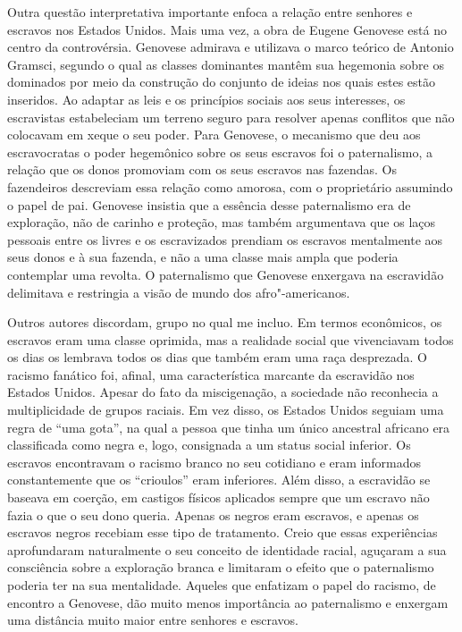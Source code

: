 Outra questão interpretativa importante enfoca a relação entre senhores
e escravos nos Estados Unidos. Mais uma vez, a obra de Eugene Genovese
está no centro da controvérsia. Genovese admirava e utilizava o marco
teórico de Antonio Gramsci, segundo o qual as classes dominantes mantêm
sua hegemonia sobre os dominados por meio da construção do conjunto de
ideias nos quais estes estão inseridos. Ao adaptar as leis e os
princípios sociais aos seus interesses, os escravistas estabeleciam um
terreno seguro para resolver apenas conflitos que não colocavam em xeque
o seu poder. Para Genovese, o mecanismo que deu aos escravocratas o
poder hegemônico sobre os seus escravos foi o paternalismo, a relação
que os donos promoviam com os seus escravos nas fazendas. Os fazendeiros
descreviam essa relação como amorosa, com o proprietário assumindo o
papel de pai. Genovese insistia que a essência desse paternalismo era de
exploração, não de carinho e proteção, mas também argumentava que os
laços pessoais entre os livres e os escravizados prendiam os escravos
mentalmente aos seus donos e à sua fazenda, e não a uma classe mais
ampla que poderia contemplar uma revolta. O paternalismo que Genovese
enxergava na escravidão delimitava e restringia a visão de mundo dos
afro"-americanos.

Outros autores discordam, grupo no qual me incluo. Em termos econômicos,
os escravos eram uma classe oprimida, mas a realidade social que
vivenciavam todos os dias os lembrava todos os dias que também eram uma %
raça desprezada. O racismo fanático foi, afinal, uma característica
marcante da escravidão nos Estados Unidos. Apesar do fato da
miscigenação, a sociedade não reconhecia a multiplicidade de grupos
raciais. Em vez disso, os Estados Unidos seguiam uma regra de ``uma
gota'', na qual a pessoa que tinha um único ancestral africano era
classificada como negra e, logo, consignada a um status social inferior.
Os escravos encontravam o racismo branco no seu cotidiano e eram
informados constantemente que os ``crioulos'' eram inferiores. Além
disso, a escravidão se baseava em coerção, em castigos físicos aplicados
sempre que um escravo não fazia o que o seu dono queria. Apenas os
negros eram escravos, e apenas os escravos negros recebiam esse tipo de
tratamento. Creio que essas experiências aprofundaram naturalmente o seu
conceito de identidade racial, aguçaram a sua consciência sobre a
exploração branca e limitaram o efeito que o paternalismo poderia ter na
sua mentalidade. Aqueles que enfatizam o papel do racismo, de encontro a
Genovese, dão muito menos importância ao paternalismo e enxergam uma
distância muito maior entre senhores e escravos.

